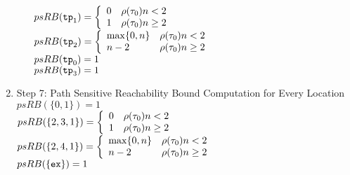 \begin{example}
\begin{enumerate}
\begin{itemize}
      $psRB(\tpath_1) = 
      \left\{
        \begin{array}{ll}
        0 & \env(\trace_0)  n < 2 \\
        1 & \env(\trace_0)  n \geq 2
        \end{array} 
      \right.$
       \\
      $psRB(\tpath_2) = 
      \left\{
        \begin{array}{ll}
        \max\{0, n\} & \env(\trace_0) n < 2 \\
        n - 2 & \env(\trace_0)  n \geq 2
        \end{array} 
      \right.$
      \\
      $psRB(\mathtt{tp}_0) = 1$ \\
      $psRB(\mathtt{tp}_3) = 1$ 
    \end{itemize}
    \item Step 7: Path Sensitive Reachability Bound Computation for Every Location
    \\
    $psRB(\{0, 1\}) = 1$ \\
    $psRB(\{2, 3, 1 \}) = 
    \left\{
      \begin{array}{ll}
      0 & \env(\trace_0) n < 2 \\
      1 & \env(\trace_0)  n \geq 2
      \end{array} 
    \right.$
     \\
    $psRB(\{2, 4, 1\}) = 
    \left\{
      \begin{array}{ll}
      \max\{0, n\} & \env(\trace_0) n < 2 \\
      n - 2 & \env(\trace_0)  n \geq 2
      \end{array} 
    \right.$
     \\
    $psRB(\{\mathtt{ex}\}) = 1$ 
    \end{enumerate}


\end{example}
